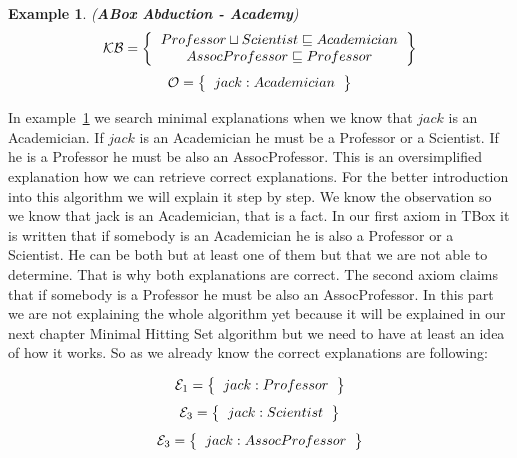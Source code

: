 \documentclass[12pt,a4paper]{article}
\newtheorem{example}{Example}[subsection]
\begin{document}
\begin{example}{(\textbf{ABox Abduction - Academy})}
	\label{example:abductionAcademy}
	\[ 
	\mathcal{KB} = \left\{
	\begin{tabular}{c c}
		$Professor \sqcup Scientist \sqsubseteq Academician$ \\
		$AssocProfessor \sqsubseteq Professor$ \\
	\end{tabular}
	\right \}
	\]
	\[ 
	\mathcal{O} = \left\{
	\begin{tabular}{c c}
		$jack : Academician$
	\end{tabular}
	\right \}
	\]								
	
\end{example}

In example~\ref{example:abductionAcademy} we search minimal explanations when we know that $jack$ is an Academician. If $jack$ is an Academician he must be a Professor or a Scientist. If he is a Professor he must be also an AssocProfessor. This is an oversimplified explanation how we can retrieve correct explanations. For the better introduction into this algorithm we will explain it step by step. We know the observation so we know that jack is an Academician, that is a fact. In our first axiom in TBox it is written that if somebody is an Academician he is also a Professor or a Scientist. He can be both but at least one of them but that we are not able to determine. That is why both explanations are correct. The second axiom claims that if somebody is a Professor he must be also an AssocProfessor. In this part we are not explaining the whole algorithm yet because it will be explained in our next chapter Minimal Hitting Set algorithm but we need to have at least an idea of how it works. So as we already know the correct explanations are following:

\[ 
\mathcal{E}_{1} = \left\{
\begin{tabular}{c c}
	$jack : Professor$ \\
\end{tabular}
\right \}
\]
\[ 
\mathcal{E}_{3} = \left\{
\begin{tabular}{c c}
	$jack : Scientist$ \\
\end{tabular}
\right \}
\]
\[ 
\mathcal{E}_{3} = \left\{
\begin{tabular}{c c}
	$jack : AssocProfessor$ \\
\end{tabular}
\right \}
\]
\end{document}

